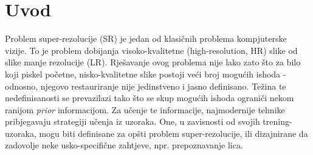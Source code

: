 \documentclass[12pt]{report}
\numberwithin{equation}{section}
\begin{document}
{
{} %
}
\titlep
\prvunutr



\apstrakt
\apstrakten


\tableofcontents
\afterpreface

\doublespacing








\listoffigures 
 
\listoftables 

\chapter{Uvod}\label{ch1}


Problem super-rezolucije (SR) je jedan od klasičnih problema kompjuterske vizije. To je problem dobijanja visoko-kvalitetne (high-resolution, HR) slike od slike manje rezolucije (LR). Rješavanje ovog problema nije lako zato što za bilo koji piskel početne, nisko-kvalitetne slike postoji veći broj mogućih ishoda - odnosno, njegovo restauriranje nije jedinstveno i jasno definisano. Težina te nedefinisanosti se prevazilazi tako što se skup mogućih ishoda ograniči nekom ranijom \textit{prior} informacijom. Za učenje te informacije, najmodernije tehnike pribjegavaju strategiji učenja iz uzoraka.  One, u zavisnosti od svojih trening-uzoraka, mogu biti definisane za opšti problem super-rezolucije, ili dizajnirane da zadovolje neke usko-specifične zahtjeve, npr. prepoznavanje lica.     


\end{document}
